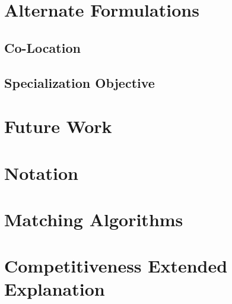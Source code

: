 \documentclass{article}
\begin{document}


\section{Alternate Formulations}



\subsection{Co-Location}



\subsection{Specialization Objective}



\section{Future Work}



\nocite{*}



\newpage

\appendix
\appendixpage
\addappheadtotoc

\section{Notation}



\section{Matching Algorithms}
\label{Matching}



\section{Competitiveness Extended Explanation}
\label{Competitiveness_Extended}



\end{document}
